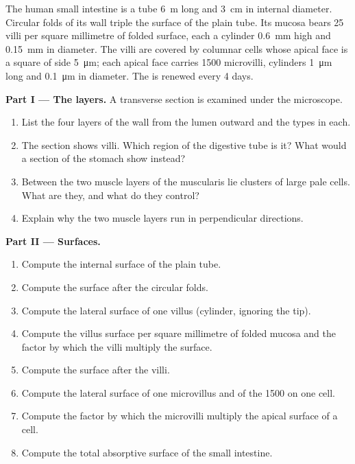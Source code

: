 \begin{problem}
\label{pb:b1:body-plans-tissues:1}
The human small intestine is a tube \qty{6}{m} long and \qty{3}{cm} in
internal diameter. Circular folds of its wall triple the surface of the
plain tube. Its mucosa bears \qty{25}{} villi per square millimetre of
folded surface, each a cylinder \qty{0.6}{mm} high and \qty{0.15}{mm} in
diameter. The villi are covered by columnar cells whose apical face is
a square of side \qty{5}{\micro m}; each apical face carries
\qty{1500}{} microvilli, cylinders \qty{1}{\micro m} long and
\qty{0.1}{\micro m} in diameter. The  is renewed every
\qty{4}{} days.

\medskip
\noindent\textbf{Part I --- The layers.}
A transverse section is examined under the microscope.
\begin{enumerate}
  \item List the four layers of the wall from the lumen outward and the
         types in each.
  \item The section shows villi. Which region of the digestive tube
        is it? What would a section of the stomach show instead?
  \item Between the two muscle layers of the muscularis lie clusters of
        large pale cells. What are they, and what do they control?
  \item Explain why the two muscle layers run in perpendicular
        directions.
\end{enumerate}

\medskip
\noindent\textbf{Part II --- Surfaces.}
\begin{enumerate}[resume]
  \item Compute the internal surface of the plain tube.
  \item Compute the surface after the circular folds.
  \item Compute the lateral surface of one villus (cylinder, ignoring
        the tip).
  \item Compute the villus surface per square millimetre of folded
        mucosa and the factor by which the villi multiply the surface.
  \item Compute the surface after the villi.
  \item Compute the lateral surface of one microvillus and of the
        \qty{1500}{} on one cell.
  \item Compute the factor by which the microvilli multiply the apical
        surface of a cell.
  \item Compute the total absorptive surface of the small intestine.
\end{enumerate}


\end{problem}
